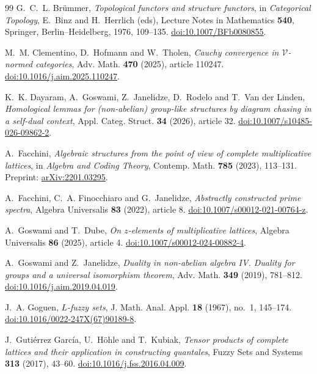 \documentclass[12pt,a4paper]{amsart}
\theoremstyle{definition}
\begin{document}
\begin{thebibliography}{99}
G.~C.~L. Br\"ummer,
\emph{Topological functors and structure functors},
in \emph{Categorical Topology},
E.~Binz and H.~Herrlich (eds),
Lecture Notes in Mathematics \textbf{540},
Springer, Berlin--Heidelberg, 1976, 109--135.
\href{https://doi.org/10.1007/BFb0080855}{doi:10.1007/BFb0080855}.

M.~M. Clementino, D.~Hofmann and W.~Tholen,
\emph{Cauchy convergence in $\mathcal V$-normed categories},
Adv. Math. \textbf{470} (2025), article 110247.
\href{https://doi.org/10.1016/j.aim.2025.110247}{doi:10.1016/j.aim.2025.110247}.

K.~K. Dayaram, A.~Goswami, Z.~Janelidze, D.~Rodelo and T.~Van der Linden,
\emph{Homological lemmas for (non-abelian) group-like structures by diagram chasing in a self-dual context},
Appl. Categ. Struct. \textbf{34} (2026), article 32.
\href{https://doi.org/10.1007/s10485-026-09862-2}{doi:10.1007/s10485-026-09862-2}.

A.~Facchini,
\emph{Algebraic structures from the point of view of complete multiplicative lattices},
in \emph{Algebra and Coding Theory},
Contemp. Math. \textbf{785} (2023), 113--131.
Preprint: \href{https://arxiv.org/abs/2201.03295}{arXiv:2201.03295}.

A.~Facchini, C.~A. Finocchiaro and G.~Janelidze,
\emph{Abstractly constructed prime spectra},
Algebra Universalis \textbf{83} (2022), article 8.
\href{https://doi.org/10.1007/s00012-021-00764-z}{doi:10.1007/s00012-021-00764-z}.

A.~Goswami and T.~Dube,
\emph{On $z$-elements of multiplicative lattices},
Algebra Universalis \textbf{86} (2025), article 4.
\href{https://doi.org/10.1007/s00012-024-00882-4}{doi:10.1007/s00012-024-00882-4}.

A.~Goswami and Z.~Janelidze,
\emph{Duality in non-abelian algebra IV. Duality for groups and a universal isomorphism theorem},
Adv. Math. \textbf{349} (2019), 781--812.
\href{https://doi.org/10.1016/j.aim.2019.04.019}{doi:10.1016/j.aim.2019.04.019}.

J.~A. Goguen,
\emph{$L$-fuzzy sets},
J. Math. Anal. Appl. \textbf{18} (1967), no.~1, 145--174.
\href{https://doi.org/10.1016/0022-247X(67)90189-8}{doi:10.1016/0022-247X(67)90189-8}.

J.~Guti\'errez Garc\'ia, U.~H\"ohle and T.~Kubiak,
\emph{Tensor products of complete lattices and their application in constructing quantales},
Fuzzy Sets and Systems \textbf{313} (2017), 43--60.
\href{https://doi.org/10.1016/j.fss.2016.04.009}{doi:10.1016/j.fss.2016.04.009}.


\end{thebibliography}
\end{document}
